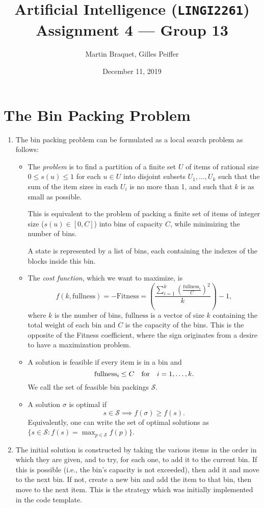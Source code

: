 \documentclass[journal,onecolumn]{IEEEtran}
\title{Artificial Intelligence (\texttt{LINGI2261}) \\ Assignment 4 --- Group 13}
\author{Martin Braquet, Gilles Peiffer}
\date{December 11, 2019}
\begin{document}
\maketitle

\section{The Bin Packing Problem}
\begin{enumerate}
	\item The bin packing problem can be formulated as a local search problem as follows:
	\begin{itemize}
		\item The \emph{problem} is to find a partition of a finite set \(U\) of items of rational size \(0 \le s(u) \le 1\) for each \(u \in U\) into disjoint subsets \(U_1, \ldots, U_k\) such that the sum of the item sizes in each \(U_i\) is no more than 1, and such that \(k\) is as small as possible.
		
		This is equivalent to the problem of packing a finite set of items of integer size (\(s(u) \in [0, C]\)) into bins of capacity \(C\), while minimizing the number of bins.
		
		A state is represented by a list of bins, each containing the indexes of the blocks inside this bin.
		\item The \emph{cost function}, which we want to maximize, is
		\[
		f(k, \bm{\mathrm{fullness}}) = -\mathrm{Fitness} =  \left(\frac{\sum_{i=1}^{k} \left(\frac{\mathrm{fullness}_i}{C}\right)^2}{k}\right) - 1,
		\]
		where \(k\) is the number of bins, \(\bm{\mathrm{fullness}}\) is a vector of size \(k\) containing the total weight of each bin and \(C\) is the capacity of the bins.
		This is the opposite of the Fitness coefficient, where the sign originates from a desire to have a maximization problem.
		\item A solution is feasible if every item is in a bin and
		\[
		\mathrm{fullness}_i \le C \quad \textnormal{for} \quad i = 1, \ldots, k.
		\]
		We call the set of feasible bin packings \(\mathcal{S}\).
		\item A solution \(\sigma\) is optimal if
		\[
		s \in \mathcal{S} \implies f(\sigma) \ge f(s).
		\]
		Equivalently, one can write the set of optimal solutions as \(\{s \in \mathcal{S} : f(s) = \max_{p \in \mathcal{S}} f(p)\}\).
	\end{itemize}
	\item The initial solution is constructed by taking the various items in the order in which they are given, and to try, for each one, to add it to the current bin.
	If this is possible (i.e., the bin's capacity is not exceeded), then add it and move to the next bin.
	If not, create a new bin and add the item to that bin, then move to the next item.
	This is the strategy which was initially implemented in the code template.
	

\end{enumerate}
\end{document}
